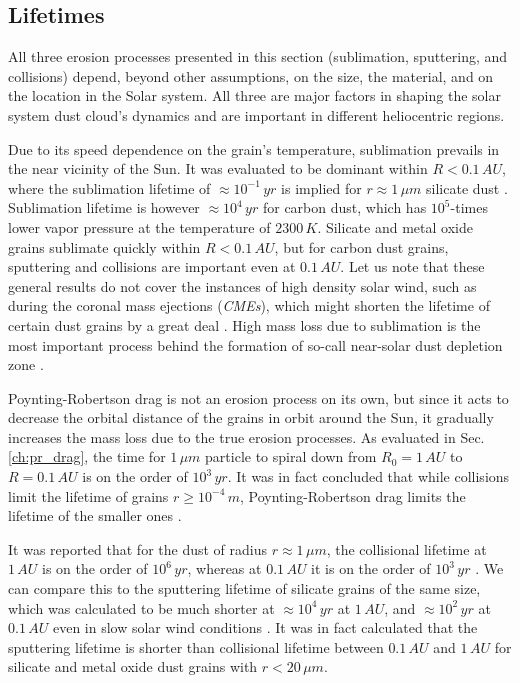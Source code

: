 \subsection{Lifetimes}

All three erosion processes presented in this section (sublimation, sputtering, and collisions) depend, beyond other assumptions, on the size, the material, and on the location in the Solar system. All three are major factors in shaping the solar system dust cloud's dynamics and are important in different heliocentric regions. 

Due to its speed dependence on the grain's temperature, sublimation prevails in the near vicinity of the Sun. It was evaluated to be dominant within $R < 0.1 \, \si{AU}$, where the sublimation lifetime of $\approx 10^{-1} \, \si{yr}$ is implied for $r \approx 1 \, \si{\mu m}$ silicate dust \cite{baumann2020dust}. Sublimation lifetime is however $\approx 10^{4} \, \si{yr}$ for carbon dust, which has $10^5$-times lower vapor pressure at the temperature of $2300\, \si{K}$. Silicate and metal oxide grains sublimate quickly within $R<0.1\, \si{AU}$, but for carbon dust grains, sputtering and collisions are important even at $0.1 \, \si{AU}$. Let us note that these general results do not cover the instances of high density solar wind, such as during the coronal mass ejections (\textit{CMEs}), which might shorten the lifetime of certain dust grains by a great deal \citep{baumann2020dust}. High mass loss due to sublimation is the most important process behind the formation of so-call near-solar dust depletion zone \citep{russell1929meteoric}. 

Poynting-Robertson drag is not an erosion process on its own, but since it acts to decrease the orbital distance of the grains in orbit around the Sun, it gradually increases the mass loss due to the true erosion processes. As evaluated in Sec. \ref{ch:pr_drag}, the time for $1 \, \si{\mu m}$ particle to spiral down from $R_0 = 1 \, \si{AU}$ to $R = 0.1 \, \si{AU}$ is on the order of $10^3 \, \si{yr}$. It was in fact concluded that while collisions limit the lifetime of grains $r \geq 10^{-4} \, \si{m}$, Poynting-Robertson drag limits the lifetime of the smaller ones \citep{grun1985collisional}. 

It was reported that for the dust of radius $r \approx 1 \, \si{\mu m}$, the collisional lifetime at $1\,\si{AU}$ is on the order of $10^6 \, \si{yr}$, whereas at $0.1\,\si{AU}$ it is on the order of $10^3 \, \si{yr}$ \citep{grun1985collisional}. We can compare this to the sputtering lifetime of silicate grains of the same size, which was calculated to be much shorter at  $\approx 10^4 \, \si{yr}$ at $1\,\si{AU}$, and $\approx 10^2 \, \si{yr}$ at $0.1\,\si{AU}$ even in slow solar wind conditions \citep{klepper2021influence}. It was in fact calculated \citep{klepper2021influence} that the sputtering lifetime is shorter than collisional lifetime between $0.1 \, \si{AU}$ and $1 \, \si{AU}$ for silicate and metal oxide dust grains with $r<20 \, \si{\mu m}$.

